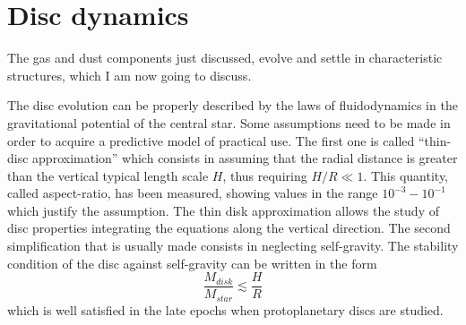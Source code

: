 \documentclass[a4paper,10pt]{report}
\begin{document}
\section{Disc dynamics}

The gas and dust components just discussed, 
evolve and settle in characteristic structures, which I am now going to discuss.

The disc evolution can be properly described by the laws of fluidodynamics in the gravitational potential of the central star.
Some assumptions need to be made in order to acquire a predictive model of practical use.
The first one is called ``thin-disc approximation'' which consists in assuming that the radial distance is greater than 
the vertical typical length scale $H$, thus requiring $H/R \ll 1$. This quantity, called aspect-ratio, has been measured, 
showing values in the range $10^{-3}-10^{-1}$ which justify the assumption. The thin disk approximation allows the study of disc properties integrating
the equations along the vertical direction.
The second simplification that is usually made consists in neglecting self-gravity.
The stability condition of the disc against self-gravity can be written in the form
\begin{equation}
    \frac{M_{disk}}{M_{star}} \lesssim  \frac{H}{R}
\end{equation}
which is well satisfied in the late epochs when protoplanetary discs are studied.
\end{document}
